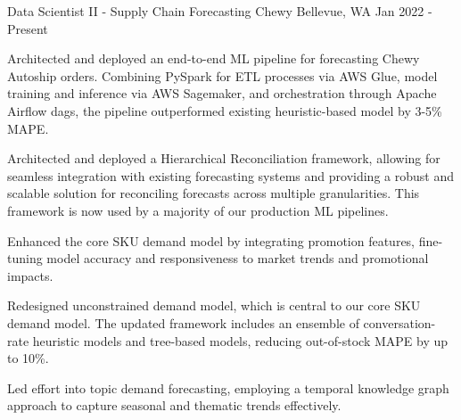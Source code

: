 \begin{cventries}
  \cventry
    {Data Scientist II - Supply Chain Forecasting} %
    {Chewy} %
    {Bellevue, WA} %
    {Jan 2022 - Present} %
    {
      \begin{cvitems}    
        \item {Architected and deployed an end-to-end ML pipeline for forecasting Chewy Autoship orders. Combining PySpark for ETL processes via AWS Glue, model training and inference via AWS Sagemaker, and orchestration through Apache Airflow dags, the pipeline outperformed existing heuristic-based model by 3-5\% MAPE.}    
        \item {Architected and deployed a Hierarchical Reconciliation framework, allowing for seamless integration with existing forecasting systems and providing a robust and scalable solution for reconciling forecasts across multiple granularities. This framework is now used by a majority of our production ML pipelines.}
        \item {Enhanced the core SKU demand model by integrating promotion features, fine-tuning model accuracy and responsiveness to market trends and promotional impacts.}
        \item {Redesigned unconstrained demand model, which is central to our core SKU demand model. The updated framework includes an ensemble of conversation-rate heuristic models and tree-based models, reducing out-of-stock MAPE by up to 10\%.}
        \item {Led effort into topic demand forecasting, employing a temporal knowledge graph approach to capture seasonal and thematic trends effectively.}
    \end{cvitems}
    }


\end{cventries}
